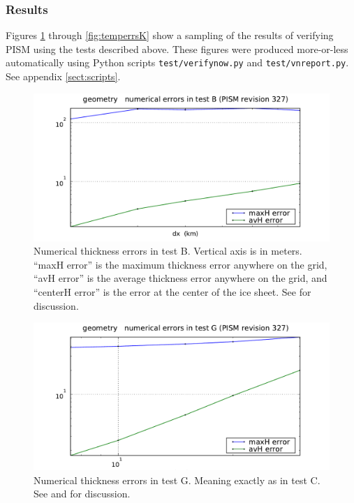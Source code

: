 \documentclass[11pt,final]{amsart}
\begin{document}
\subsubsection*{Results}  Figures \ref{fig:thickerrsB} through \ref{fig:temperrsK} show a sampling of the results of verifying PISM using the tests described above.  These figures were produced more-or-less automatically using Python scripts \verb|test/verifynow.py| and \verb|test/vnreport.py|.  See appendix \ref{sect:scripts}.

\begin{figure}[ht]
\includegraphics[width=4.8in,keepaspectratio=true]{figs/thickerrs_B}
\caption{Numerical thickness errors in test B.  Vertical axis is in meters. ``maxH error'' is the maximum thickness error anywhere on the grid, ``avH error'' is the average thickness error anywhere on the grid, and ``centerH error'' is the error at the center of the ice sheet.  See \cite{BLKCB} for discussion.}
\label{fig:thickerrsB}
\end{figure}

\begin{figure}[ht]
\includegraphics[width=4.8in,keepaspectratio=true]{figs/thickerrs_G}
\caption{Numerical thickness errors in test G.  Meaning exactly as in test C.  See \cite{BBL} and \cite{BLKCB} for discussion.}
\label{fig:thickerrsG}
\end{figure}
\end{document}
